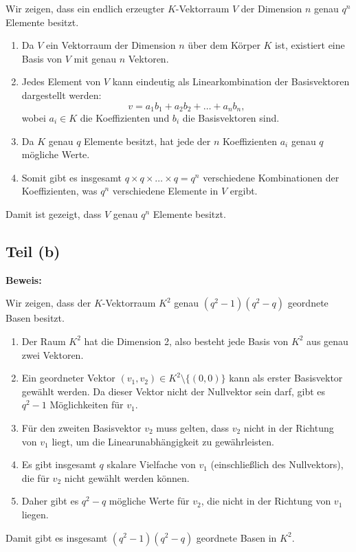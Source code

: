 \documentclass[11pt]{article}
\begin{document}
Wir zeigen, dass ein endlich erzeugter \( K \)-Vektorraum \( V \) der Dimension \( n \) genau \( q^n \) Elemente besitzt.

\begin{enumerate}
    \item Da \( V \) ein Vektorraum der Dimension \( n \) über dem Körper \( K \) ist, existiert eine Basis von \( V \) mit genau \( n \) Vektoren.
    \item Jedes Element von \( V \) kann eindeutig als Linearkombination der Basisvektoren dargestellt werden:
    \[
    v = a_1 b_1 + a_2 b_2 + \dots + a_n b_n,
    \]
    wobei \( a_i \in K \) die Koeffizienten und \( b_i \) die Basisvektoren sind.
    \item Da \( K \) genau \( q \) Elemente besitzt, hat jede der \( n \) Koeffizienten \( a_i \) genau \( q \) mögliche Werte.
    \item Somit gibt es insgesamt \( q \times q \times \dots \times q = q^n \) verschiedene Kombinationen der Koeffizienten, was \( q^n \) verschiedene Elemente in \( V \) ergibt.
\end{enumerate}
Damit ist gezeigt, dass \( V \) genau \( q^n \) Elemente besitzt.

\subsection*{Teil (b)}

\textbf{Beweis:}

Wir zeigen, dass der \( K \)-Vektorraum \( K^2 \) genau \( (q^2 - 1)(q^2 - q) \) geordnete Basen besitzt.

\begin{enumerate}
    \item Der Raum \( K^2 \) hat die Dimension 2, also besteht jede Basis von \( K^2 \) aus genau zwei Vektoren.
    \item Ein geordneter Vektor \( (v_1, v_2) \in K^2 \setminus \{(0, 0)\} \) kann als erster Basisvektor gewählt werden. Da dieser Vektor nicht der Nullvektor sein darf, gibt es \( q^2 - 1 \) Möglichkeiten für \( v_1 \).
    \item Für den zweiten Basisvektor \( v_2 \) muss gelten, dass \( v_2 \) nicht in der Richtung von \( v_1 \) liegt, um die Linearunabhängigkeit zu gewährleisten.
    \item Es gibt insgesamt \( q \) skalare Vielfache von \( v_1 \) (einschließlich des Nullvektors), die für \( v_2 \) nicht gewählt werden können.
    \item Daher gibt es \( q^2 - q \) mögliche Werte für \( v_2 \), die nicht in der Richtung von \( v_1 \) liegen.
\end{enumerate}
Damit gibt es insgesamt \( (q^2 - 1)(q^2 - q) \) geordnete Basen in \( K^2 \).
\end{document}

